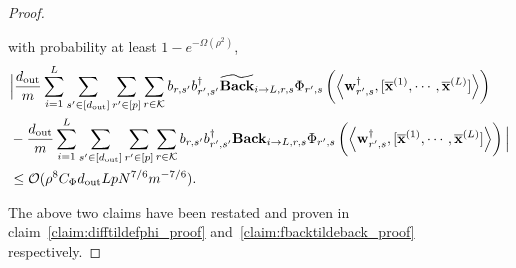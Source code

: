 \begin{proof}
\begin{claim}\label{claim:fbacktildeback}
	with probability at least $1 - e^{-\Omega(\rho^2)}$,
	\begin{align*}
		&\Big| \frac{d_{\mathrm{out}} }{m} \sum_{i=1}^{L}  \sum_{s' \in [d_{\mathrm{out}} ]} \sum_{r' \in [p]} \sum_{r \in \mathcal{K}}  b_{r, s'} b_{r', s'}^{\dagger} \widetilde{\mathbf{Back}}_{i \to L, r, s} \Phi_{r', s} \left(\left\langle \mathbf{w}_{r', s}^{\dagger}, [\overline{\mathbf{x}}^{(1)}, \cdots, \overline{\mathbf{x}}^{(L)}]\right\rangle\right) \\& - \frac{d_{\mathrm{out}} }{m} \sum_{i=1}^{L}  \sum_{s' \in [d_{\mathrm{out}} ]} \sum_{r' \in [p]} \sum_{r \in \mathcal{K}}  b_{r, s'} b_{r', s'}^{\dagger} \mathbf{Back}_{i \to L, r, s} \Phi_{r', s} \left(\left\langle \mathbf{w}_{r', s}^{\dagger}, [\overline{\mathbf{x}}^{(1)}, \cdots, \overline{\mathbf{x}}^{(L)}]\right\rangle\right) \Big| \\& \le \mathcal{O}(\rho^8 C_{\Phi} d_{\mathrm{out}} Lp N^{7/6} m^{-7/6}). 
	\end{align*}
\end{claim}
The above two claims have been restated and proven in claim~\ref{claim:difftildefphi_proof} and~\ref{claim:fbacktildeback_proof} respectively.


\end{proof}
